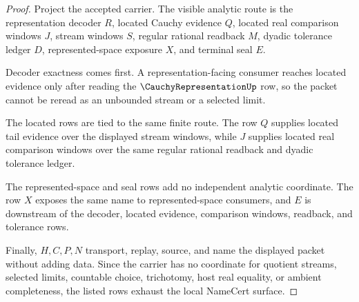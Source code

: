 \begin{proof}
Project the accepted carrier. The visible analytic route is the representation decoder $R$, located Cauchy evidence $Q$, located real comparison windows $J$, stream windows $S$, regular rational readback $M$, dyadic tolerance ledger $D$, represented-space exposure $X$, and terminal seal $E$.

Decoder exactness comes first. A representation-facing consumer reaches located evidence only after reading the $\CauchyRepresentationUp$ row, so the packet cannot be reread as an unbounded stream or a selected limit.

The located rows are tied to the same finite route. The row $Q$ supplies located tail evidence over the displayed stream windows, while $J$ supplies located real comparison windows over the same regular rational readback and dyadic tolerance ledger.

The represented-space and seal rows add no independent analytic coordinate. The row $X$ exposes the same name to represented-space consumers, and $E$ is downstream of the decoder, located evidence, comparison windows, readback, and tolerance rows.

Finally, $H,C,P,N$ transport, replay, source, and name the displayed packet without adding data. Since the carrier has no coordinate for quotient streams, selected limits, countable choice, trichotomy, host real equality, or ambient completeness, the listed rows exhaust the local NameCert surface.
\end{proof}

